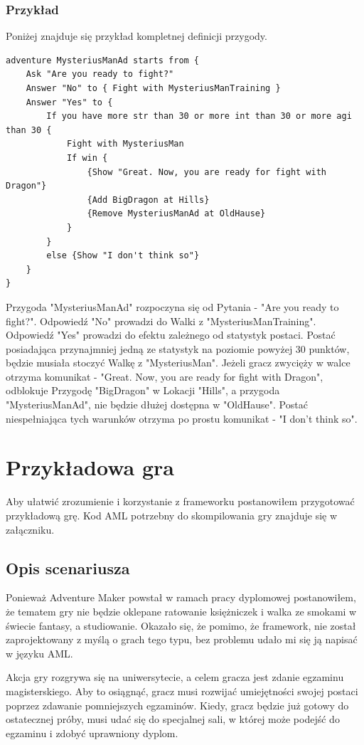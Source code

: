 \documentclass	{xmgr}
\begin{document}
\subsection{Przykład}
Poniżej znajduje się przykład kompletnej definicji przygody.
\begin{lstlisting}
adventure MysteriusManAd starts from {
	Ask "Are you ready to fight?"
	Answer "No" to { Fight with MysteriusManTraining }
	Answer "Yes" to {
		If you have more str than 30 or more int than 30 or more agi than 30 {
			Fight with MysteriusMan
			If win {
				{Show "Great. Now, you are ready for fight with Dragon"}
				{Add BigDragon at Hills}
				{Remove MysteriusManAd at OldHause}
			}
		}
		else {Show "I don't think so"}
	}
}
\end{lstlisting}
Przygoda "MysteriusManAd" rozpoczyna się od Pytania - "Are you ready to fight?". Odpowiedź "No" prowadzi do Walki z "MysteriusManTraining".
Odpowiedź "Yes" prowadzi do efektu zależnego od statystyk postaci. Postać posiadająca przynajmniej jedną ze statystyk na poziomie powyżej 30 punktów, będzie musiała stoczyć Walkę z "MysteriusMan". Jeżeli gracz zwycięży w walce otrzyma komunikat - "Great. Now, you are ready for fight with Dragon", odblokuje Przygodę "BigDragon" w Lokacji "Hills", a przygoda "MysteriusManAd", nie będzie dłużej dostępna w "OldHause". Postać niespełniająca tych warunków otrzyma po prostu komunikat - "I don't think so". 

\chapter{Przykładowa gra}
Aby ułatwić zrozumienie i korzystanie z frameworku postanowiłem przygotować przykładową grę. Kod AML potrzebny do skompilowania gry znajduje się w załączniku.

\section{Opis scenariusza}

Ponieważ Adventure Maker powstał w ramach pracy dyplomowej postanowiłem, że tematem gry nie będzie oklepane ratowanie księżniczek i walka ze smokami w świecie fantasy, a studiowanie. Okazało się, że pomimo, że framework, nie został zaprojektowany z myślą o grach tego typu, bez problemu udało mi się ją napisać w języku AML.

Akcja gry rozgrywa się na uniwersytecie, a celem gracza jest zdanie egzaminu magisterskiego. Aby to osiągnąć, gracz musi rozwijać umiejętności swojej postaci poprzez zdawanie pomniejszych egzaminów. Kiedy, gracz będzie już gotowy do ostatecznej próby, musi udać się do specjalnej sali, w której może podejść do egzaminu i zdobyć uprawniony dyplom.
\end{document}
